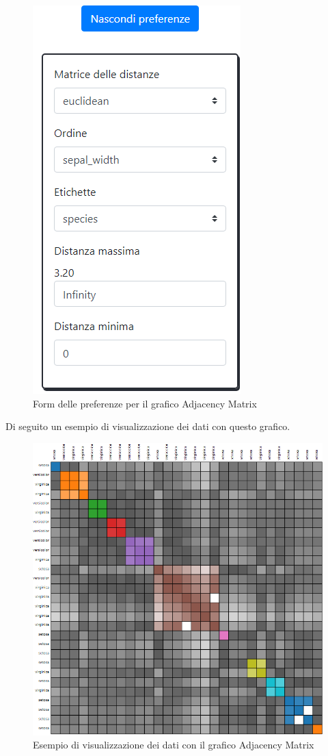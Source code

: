 \begin{figure}[H]
		\includegraphics[scale=0.7]{Images/amp.png}
		\centering
		\caption{Form delle preferenze per il grafico Adjacency Matrix}
\end{figure}

\newpage
Di seguito un esempio di visualizzazione dei dati con questo grafico.

\begin{figure}[H]
		\includegraphics[scale=0.6]{Images/am.png}
		\centering
		\caption{Esempio di visualizzazione dei dati con il grafico Adjacency Matrix}
\end{figure}

